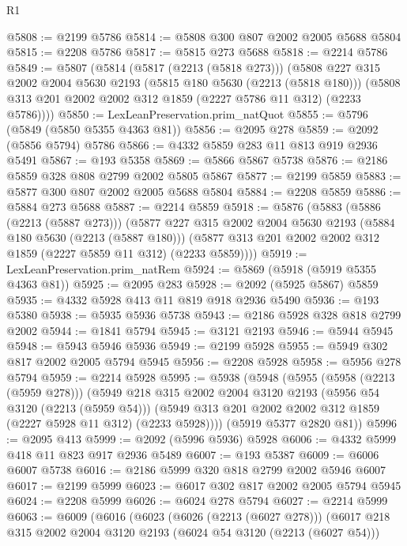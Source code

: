 \begin{lexlean}{R1}
\begin{coremodule}
@5808 := @2199 @5786
@5814 := @5808 @300 @807 @2002 @2005 @5688 @5804
@5815 := @2208 @5786
@5817 := @5815 @273 @5688
@5818 := @2214 @5786
@5849 := @5807
    (@5814
      (@5817 (@2213 (@5818 @273)))
      (@5808
        @227
        @315
        @2002
        @2004
        @5630
        @2193
        (@5815 @180 @5630 (@2213 (@5818 @180)))
        (@5808 @313 @201 @2002 @2002 @312 @1859 (@2227 @5786 @11 @312) (@2233 @5786))))
@5850 := LexLeanPreservation.prim_natQuot
@5855 := @5796 (@5849 (@5850 @5355 @4363 @81))
@5856 := @2095 @278
@5859 := @2092 (@5856 @5794) @5786
@5866 := @4332 @5859 @283 @11 @813 @919 @2936 @5491
@5867 := @193 @5358
@5869 := @5866 @5867 @5738
@5876 := @2186 @5859 @328 @808 @2799 @2002 @5805 @5867
@5877 := @2199 @5859
@5883 := @5877 @300 @807 @2002 @2005 @5688 @5804
@5884 := @2208 @5859
@5886 := @5884 @273 @5688
@5887 := @2214 @5859
@5918 := @5876
    (@5883
      (@5886 (@2213 (@5887 @273)))
      (@5877
        @227
        @315
        @2002
        @2004
        @5630
        @2193
        (@5884 @180 @5630 (@2213 (@5887 @180)))
        (@5877 @313 @201 @2002 @2002 @312 @1859 (@2227 @5859 @11 @312) (@2233 @5859))))
@5919 := LexLeanPreservation.prim_natRem
@5924 := @5869 (@5918 (@5919 @5355 @4363 @81))
@5925 := @2095 @283
@5928 := @2092 (@5925 @5867) @5859
@5935 := @4332 @5928 @413 @11 @819 @918 @2936 @5490
@5936 := @193 @5380
@5938 := @5935 @5936 @5738
@5943 := @2186 @5928 @328 @818 @2799 @2002
@5944 := @1841 @5794
@5945 := @3121 @2193
@5946 := @5944 @5945
@5948 := @5943 @5946 @5936
@5949 := @2199 @5928
@5955 := @5949 @302 @817 @2002 @2005 @5794 @5945
@5956 := @2208 @5928
@5958 := @5956 @278 @5794
@5959 := @2214 @5928
@5995 := @5938
    (@5948
      (@5955
        (@5958 (@2213 (@5959 @278)))
        (@5949
          @218
          @315
          @2002
          @2004
          @3120
          @2193
          (@5956 @54 @3120 (@2213 (@5959 @54)))
          (@5949 @313 @201 @2002 @2002 @312 @1859 (@2227 @5928 @11 @312) (@2233 @5928))))
      (@5919 @5377 @2820 @81))
@5996 := @2095 @413
@5999 := @2092 (@5996 @5936) @5928
@6006 := @4332 @5999 @418 @11 @823 @917 @2936 @5489
@6007 := @193 @5387
@6009 := @6006 @6007 @5738
@6016 := @2186 @5999 @320 @818 @2799 @2002 @5946 @6007
@6017 := @2199 @5999
@6023 := @6017 @302 @817 @2002 @2005 @5794 @5945
@6024 := @2208 @5999
@6026 := @6024 @278 @5794
@6027 := @2214 @5999
@6063 := @6009
    (@6016
      (@6023
        (@6026 (@2213 (@6027 @278)))
        (@6017
          @218
          @315
          @2002
          @2004
          @3120
          @2193
          (@6024 @54 @3120 (@2213 (@6027 @54)))

\end{coremodule}
\end{lexlean}
